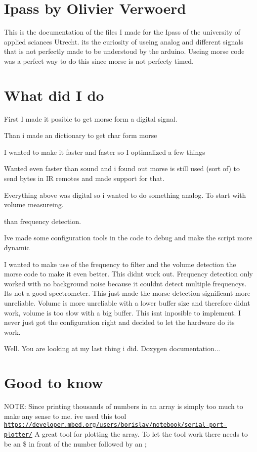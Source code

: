 \hypertarget{index_Ipass}{}\section{Ipass by Olivier Verwoerd}\label{index_Ipass}
This is the documentation of the files I made for the Ipass of the university of applied sciances Utrecht. it\textquotesingle{}s the curiosity of useing analog and different signals that is not perfectly made to be understoud by the arduino. Useing morse code was a perfect way to do this since morse is not perfecty timed.\hypertarget{index_work}{}\section{What did I do}\label{index_work}

\begin{DoxyEnumerate}
\item First I made it posible to get morse form a digital signal.
\item Than i made an dictionary to get char form morse
\item I wanted to make it faster and faster so I optimalized a few things
\item Wanted even faster than sound and i found out morse is still used (sort of) to send bytes in IR remotes and made support for that.
\item Everything above was digital so i wanted to do something analog. To start with volume measureing.
\item than frequency detection.
\item I\textquotesingle{}ve made some configuration tools in the code to debug and make the script more dynamic
\item I wanted to make use of the frequency to filter and the volume detection the morse code to make it even better. This didn\textquotesingle{}t work out. Frequency detection only worked with no background noise because it couldn\textquotesingle{}t detect multiple frequencys. It\textquotesingle{}s not a good spectrometer. This just made the morse detection significant more unreliable. Volume is more unreliable with a lower buffer size and therefore didn\textquotesingle{}t work, volume is too slow with a big buffer. This isn\textquotesingle{}t inposible to implement. I never just got the configuration right and decided to let the hardware do it\textquotesingle{}s work.
\item Well. You are looking at my last thing i did. Doxygen documentation...
\end{DoxyEnumerate}\hypertarget{index_handy}{}\section{Good to know}\label{index_handy}
N\+O\+TE\+: Since printing thousands of numbers in an array is simply too much to make any sense to me. i\textquotesingle{}ve used this tool \href{https://developer.mbed.org/users/borislav/notebook/serial-port-plotter/}{\tt https\+://developer.\+mbed.\+org/users/borislav/notebook/serial-\/port-\/plotter/} A great tool for plotting the array. To let the tool work there needs to be an \$ in front of the number followed by an ;

